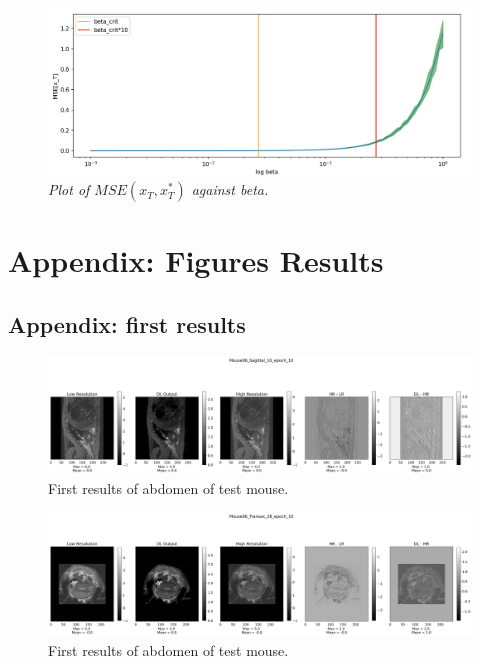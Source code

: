 \documentclass[twocolumn]{article}
\begin{document}
\begin{appendices}
\begin{figure}[h!]
    \centering
    \includegraphics[width=0.8\linewidth]{beta_sweep.png}
    \caption{\textit{Plot of $MSE(x_T, x_T^*)$ against beta. }}
    \label{fig:beta sweep}
\end{figure}

\FloatBarrier

\clearpage
\newpage
\section{Appendix: Figures Results}
\subsection{Appendix: first results}
\label{Appendix: first results}
\begin{figure}[h]
    \centering
    \includegraphics[width=1\linewidth]{Mouse06_Sagittal_10_epoch_10.png}
    \caption{First results of abdomen of test mouse.}
\end{figure}

\begin{figure}[h]
    \centering
    \includegraphics[width=1\linewidth]{Mouse06_Transax_28_epoch_10.png}
    \caption{First results of abdomen of test mouse.}
\end{figure}


\end{appendices}
\end{document}
